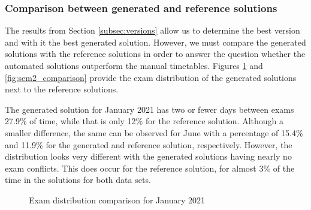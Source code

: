\subsubsection{Comparison between generated and reference solutions}

The results from Section \ref{subsec:versions} allow us to determine the best version and with it the best generated solution. However, we must compare the generated solutions with the reference solutions in order to answer the question whether the automated solutions outperform the manual timetables. Figures \ref{fig:sem1_comparison} and \ref{fig:sem2_comparison} provide the exam distribution of the generated solutions next to the reference solutions. 

The generated solution for January 2021 has two or fewer days between exams 27.9\% of time, while that is only 12\% for the reference solution.  Although a smaller difference, the same can be observed for June with a percentage of 15.4\% and 11.9\% for the generated and reference solution, respectively. However, the distribution looks very different with the generated solutions having nearly no exam conflicts. This does occur for the reference solution, for almost 3\% of the time in the solutions for both data sets.


\begin{figure}[H]
  \centering
  \hfill
  \caption{Exam distribution comparison for January 2021}
  \label{fig:sem1_comparison}
\end{figure}

